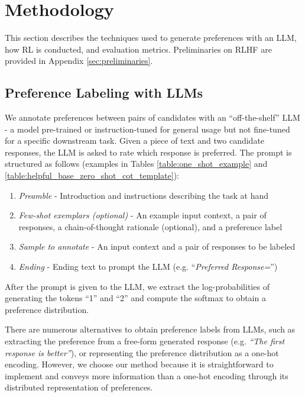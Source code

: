 \documentclass[11pt]{article}
\begin{document}
\section{Methodology}

This section describes the techniques used to generate preferences with an LLM, how RL is conducted, and evaluation metrics. Preliminaries on RLHF are provided in Appendix \ref{sec:preliminaries}.

\subsection{Preference Labeling with LLMs}
\label{sec:preference_labeling}

We annotate preferences between pairs of candidates with an ``off-the-shelf'' LLM - a model pre-trained or instruction-tuned \citep{wei2021finetuned} for general usage but not fine-tuned for a specific downstream task. Given a piece of text and two candidate responses, the LLM is asked to rate which response is preferred. The prompt is structured as follows (examples in Tables \ref{table:one_shot_example} and \ref{table:helpful_base_zero_shot_cot_template}):

\begin{enumerate}[noitemsep]
    \item \textit{Preamble} - Introduction and instructions describing the task at hand
    \item \textit{Few-shot exemplars (optional)} - An example input context, a pair of responses, a chain-of-thought rationale (optional), and a preference label
    \item \textit{Sample to annotate} - An input context and a pair of responses to be labeled
    \item \textit{Ending} - Ending text to prompt the LLM (e.g. ``\textit{Preferred Response=}'')
\end{enumerate}

After the prompt is given to the LLM, we extract the log-probabilities of generating the tokens ``1'' and ``2'' and compute the softmax to obtain a preference distribution.

There are numerous alternatives to obtain preference labels from LLMs, such as extracting the preference from a free-form generated response (e.g. \textit{``The first response is better''}), or representing the preference distribution as a one-hot encoding. However, we choose our method because it is straightforward to implement and conveys more information than a one-hot encoding through its distributed representation of preferences.
\end{document}
